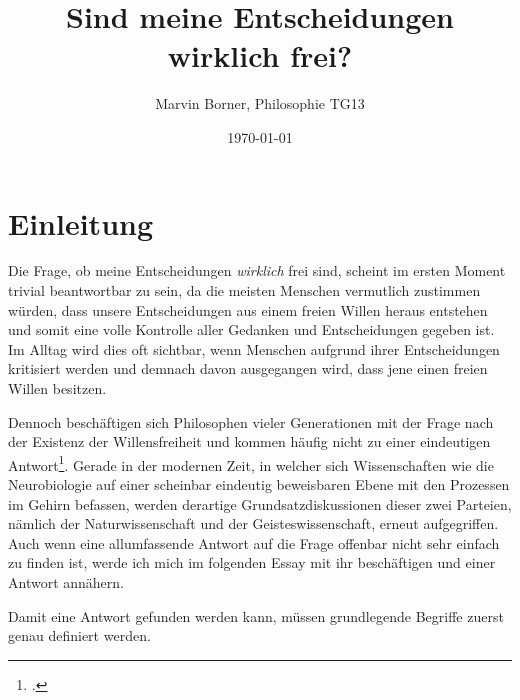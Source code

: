 \documentclass[a4paper, 12pt]{article}
\begin{document}
\title{\vspace{-2.0cm}Sind meine Entscheidungen wirklich frei?} %
\author{Marvin Borner, Philosophie TG13}
\date{\today}

%

\maketitle

\section{Einleitung}
Die Frage, ob meine Entscheidungen \textit{wirklich} frei sind, scheint im ersten Moment trivial beantwortbar zu sein, da die meisten Menschen vermutlich zustimmen würden, dass unsere Entscheidungen aus einem freien Willen heraus entstehen und somit eine volle Kontrolle aller Gedanken und Entscheidungen gegeben ist. Im Alltag wird dies oft sichtbar, wenn Menschen aufgrund ihrer Entscheidungen kritisiert werden und demnach davon ausgegangen wird, dass jene einen freien Willen besitzen.

Dennoch beschäftigen sich Philosophen vieler Generationen mit der Frage nach der Existenz der Willensfreiheit und kommen häufig nicht zu einer eindeutigen Antwort\footcite[S. 170]{walter}. Gerade in der modernen Zeit, in welcher sich Wissenschaften wie die Neurobiologie auf einer scheinbar eindeutig beweisbaren Ebene mit den Prozessen im Gehirn befassen, werden derartige Grundsatzdiskussionen dieser zwei Parteien, nämlich der Naturwissenschaft und der Geisteswissenschaft, erneut aufgegriffen. Auch wenn eine allumfassende Antwort auf die Frage offenbar nicht sehr einfach zu finden ist, werde ich mich im folgenden Essay mit ihr beschäftigen und einer Antwort annähern.

Damit eine Antwort gefunden werden kann, müssen grundlegende Begriffe zuerst genau definiert werden.
\end{document}
